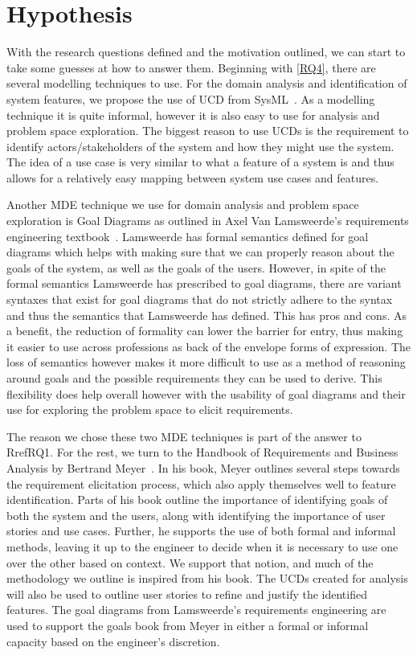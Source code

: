 \section{Hypothesis}

With the research questions defined and the motivation outlined, we can start to take some guesses at how to answer them. Beginning with \ref{RQ4}, there are several modelling techniques to use. For the domain analysis and identification of system features, we propose the use of \ac{UCD} from SysML~\cite{sysml2019omg}. As a modelling technique it is quite informal, however it is also easy to use for analysis and problem space exploration. The biggest reason to use \ac{UCD}s is the requirement to identify actors/stakeholders of the system and how they might use the system. The idea of a use case is very similar to what a feature of a system is and thus allows for a relatively easy mapping between system use cases and features.

Another \ac{MDE} technique we use for domain analysis and problem space exploration is Goal Diagrams as outlined in Axel Van Lamsweerde's requirements engineering textbook~\cite{lamsweerde2009requirements}. Lamsweerde has formal semantics defined for goal diagrams which helps with making sure that we can properly reason about the goals of the system, as well as the goals of the users. However, in spite of the formal semantics Lamsweerde has prescribed to goal diagrams, there are variant syntaxes that exist for goal diagrams that do not strictly adhere to the syntax and thus the semantics that Lamsweerde has defined. This has pros and cons. As a benefit, the reduction of formality can lower the barrier for entry, thus making it easier to use across professions as back of the envelope forms of expression. The loss of semantics however makes it more difficult to use as a method of reasoning around goals and the possible requirements they can be used to derive. This flexibility does help overall however with the usability of goal diagrams and their use for exploring the problem space to elicit requirements.

The reason we chose these two \ac{MDE} techniques is part of the answer to Rref{RQ1}. For the rest, we turn to the Handbook of Requirements and Business Analysis by Bertrand Meyer~\cite{meyer2022handbook}. In his book, Meyer outlines several steps towards the requirement elicitation process, which also apply themselves well to feature identification. Parts of his book outline the importance of identifying goals of both the system and the users, along with identifying the importance of user stories and use cases. Further, he supports the use of both formal and informal methods, leaving it up to the engineer to decide when it is necessary to use one over the other based on context. We support that notion, and much of the methodology we outline is inspired from his book. The \ac{UCD}s created for analysis will also be used to outline user stories to refine and justify the identified features. The goal diagrams from Lamsweerde's requirements engineering are used to support the goals book from Meyer in either a formal or informal capacity based on the engineer's discretion.

